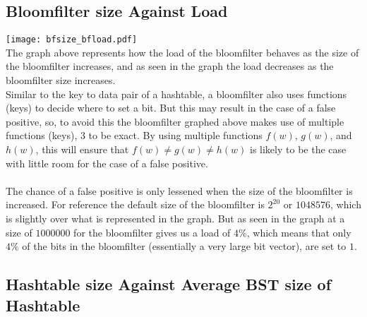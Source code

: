 \documentclass[
	12pt, %
]{fphw}
\begin{document}
\subsection{Bloomfilter size Against Load}

\texttt{[image: bfsize\_bfload.pdf]}
\\
The graph above represents how the load of the bloomfilter behaves as the size of the bloomfilter increases, and as seen in the graph the load decreases as the bloomfilter size increases. \\
Similar to the key to data pair of a hashtable, a bloomfilter also uses functions (keys) to decide where to set a bit. But this may result in the case of a false positive, so, to avoid this the bloomfilter graphed above makes use of multiple functions (keys), 3 to be exact. By using multiple functions $f(w)$, $g(w)$, and $h(w)$, this will ensure that $f(w)\neq g(w)\neq h(w)$ is likely to be the case with little room for the case of a false positive. \\
\\
The chance of a false positive is only lessened when the size of the bloomfilter is increased. For reference the default size of the bloomfilter is $2^{20}$ or $1048576$, which is slightly over what is represented in the graph. But as seen in the graph at a size of $1000000$ for the bloomfilter gives us a load of $4\%$, which means that only $4\%$ of the bits in the bloomfilter (essentially a very large bit vector), are set to $1$.



\subsection{Hashtable size Against Average BST size of Hashtable}
\end{document}

